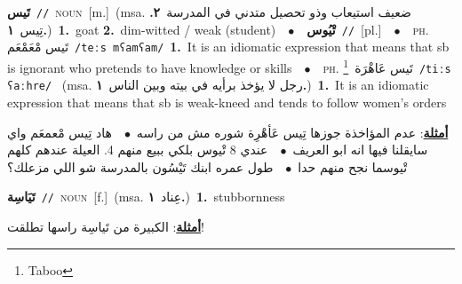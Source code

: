 \documentclass[10pt,a4paper,twoside]{article} %
\begin{document}
\begin{multicols}{2}
{\setlength\topsep{0pt}\textbf{\foreignlanguage{arabic}{تَيس}}\ {\color{gray}\texttt{//}\color{black}}\ \textsc{noun}\ [m.]\ \color{gray}(msa. \foreignlanguage{arabic}{ضعيف استيعاب وذو تحصيل متدني في المدرسة}~\foreignlanguage{arabic}{\textbf{٢.}}  \foreignlanguage{arabic}{تِيس}~\foreignlanguage{arabic}{\textbf{١.}})\color{black}\ \textbf{1.}~goat  \textbf{2.}~dim-witted / weak (student)\ \ $\bullet$\ \ \setlength\topsep{0pt}\textbf{\foreignlanguage{arabic}{تْيُوس}}\ {\color{gray}\texttt{//}\color{black}}\ [pl.]\ \ $\bullet$\ \ \textsc{ph.} \color{gray} \foreignlanguage{arabic}{تَيس مْعَمْعَم}\color{black}\ {\color{gray}\texttt{/{\sffamily teːs mʕamʕam}/}\color{black}}\ \textbf{1.}~It is an idiomatic expression that means that sb is ignorant who pretends to have knowledge or skills\ \ $\bullet$\ \ \textsc{ph.} \color{gray} \foreignlanguage{arabic}{تَيس عَاهْرَة}\color{black}\ \footnote{Taboo}\ {\color{gray}\texttt{/{\sffamily tiːs ʕaːhre}/}\color{black}}\ \color{gray} (msa. \foreignlanguage{arabic}{رجل لا يؤخذ برأيه في بيته وبين الناس}~\foreignlanguage{arabic}{\textbf{١.}})\color{black}\ \textbf{1.}~It is an idiomatic expression that means that sb is weak-kneed and tends to follow women's orders\  \begin{flushright}\color{gray}\foreignlanguage{arabic}{\textbf{\underline{\foreignlanguage{arabic}{أمثلة}}}: عدم المؤاخذة جوزها تِيس عَأهْرِة شوره مش من راسه\ $\bullet$\ \  هاد تِيس مْعمعَم واي سايقلنا فيها انه ابو العريف\ $\bullet$\ \  عندي 8 تْيوس بلكي ببيع منهم 4. العيلة عندهم كلهم تْيوسما نجح منهم حدا\ $\bullet$\ \  طول عمره ابنك تَيْسُون بالمدرسة شو اللي مزعلك؟}\end{flushright}\color{black}} \vspace{2mm}

{\setlength\topsep{0pt}\textbf{\foreignlanguage{arabic}{تَيَاسِة}}\ {\color{gray}\texttt{//}\color{black}}\ \textsc{noun}\ [f.]\ \color{gray}(msa. \foreignlanguage{arabic}{عِناد}~\foreignlanguage{arabic}{\textbf{١.}})\color{black}\ \textbf{1.}~stubbornness\  \begin{flushright}\color{gray}\foreignlanguage{arabic}{\textbf{\underline{\foreignlanguage{arabic}{أمثلة}}}: الكبيرة من تَياسِة راسها تطلقت!}\end{flushright}\color{black}} \vspace{2mm}


\end{multicols}
\end{document}
